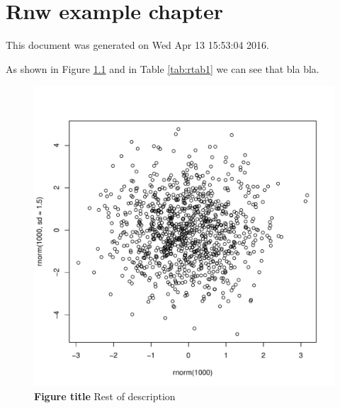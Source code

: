\chapter{Rnw example chapter}
\label{chap:rnw}





This document was generated on Wed Apr 13 15:53:04 2016.

As shown in Figure \ref{fig:some_fig} and in Table \ref{tab:rtab1} we can see that bla bla.


\begin{knitrout}
\color{fgcolor}\begin{figure}
\includegraphics[width=\maxwidth]{figure/some_fig-1} \caption[{\bf Figure title } Rest of description]{{\bf Figure title } Rest of description}\label{fig:some_fig}
\end{figure}


\end{knitrout}






